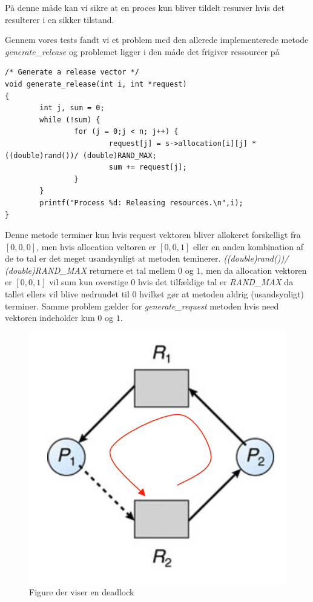 \documentclass[danish]{report}
\begin{document}
På denne måde kan vi sikre at en proces kun bliver tildelt resurser hvis det resulterer i en sikker tilstand.

Gennem vores tests fandt vi et problem med den allerede implementerede metode \textit{generate\_release} og problemet ligger i den måde det frigiver ressourcer på

\begin{lstlisting}
/* Generate a release vector */
void generate_release(int i, int *request)
{
        int j, sum = 0;
        while (!sum) {
                for (j = 0;j < n; j++) {
                        request[j] = s->allocation[i][j] * ((double)rand())/ (double)RAND_MAX;
                        sum += request[j];
                }
        }
        printf("Process %d: Releasing resources.\n",i);
}
\end{lstlisting}

Denne metode terminer kun hvis request vektoren bliver allokeret forskelligt fra $[0,0,0]$, men hvis allocation veltoren er $[0,0,1]$ eller en anden kombination af de to tal er det meget usandsynligt at metoden teminerer. \textit{((double)rand())/ (double)RAND\_MAX} returnere et tal mellem $0$ og $1$, men da allocation vektoren er $[0,0,1]$ vil sum kun overstige $0$ hvis det tilfældige tal er \textit{RAND\_MAX} da tallet ellers vil blive nedrundet til $0$ hvilket gør at metoden aldrig (usandsynligt) terminer. Samme problem gælder for \textit{generate\_request} metoden hvis need vektoren indeholder kun $0$ og $1$.


\begin{figure}[H]
\begin{center}
\includegraphics[scale=0.4]{img/2.png}
\caption{Figure der viser en deadlock}
\label{fig:2}
\end{center}
\end{figure}
\end{document}
